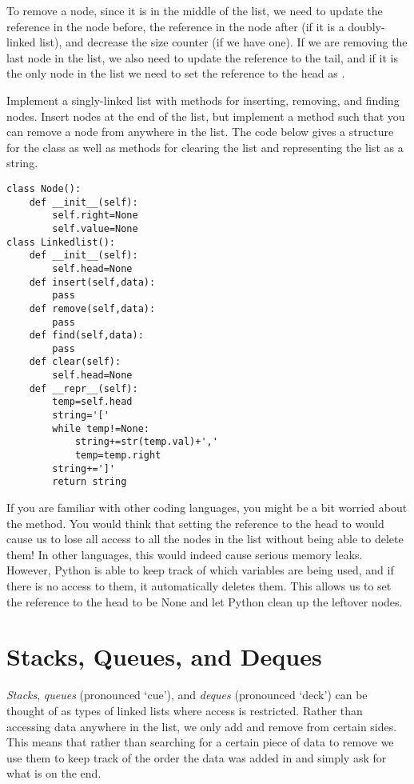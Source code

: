 To remove a node, since it is in the middle of the list, we need to update the reference in the node before, the reference in the node after (if it is a doubly-linked list), and decrease the size counter (if we have one).
If we are removing the last node in the list, we also need to update the reference to the tail, and if it is the only node in the list we need to set the reference to the head as .


\begin{problem}
Implement a singly-linked list with methods for inserting, removing, and finding nodes. Insert nodes at the end of the list, but implement a method such that you can remove a node from anywhere in the list. The code below gives a structure for the class as well as methods for clearing the list and representing the list as a string.
\begin{lstlisting}
class Node():
    def __init__(self):
        self.right=None
        self.value=None
class Linkedlist():
    def __init__(self):
        self.head=None
    def insert(self,data):
        pass
    def remove(self,data):
        pass
    def find(self,data):
        pass
    def clear(self):
        self.head=None
    def __repr__(self):
        temp=self.head
        string='['
        while temp!=None:
            string+=str(temp.val)+','
            temp=temp.right
        string+=']'
        return string
\end{lstlisting}
\label{prob:LinkedLists}
\end{problem}

If you are familiar with other coding languages, you might be a bit worried about the  method.
You would think that setting the reference to the head to  would cause us to lose all access to all the nodes in the list without being able to delete them!
In other languages, this would indeed cause serious memory leaks.
However, Python is able to keep track of which variables are being used, and if there is no access to them, it automatically deletes them.
This allows us to set the reference to the head to be None and let Python clean up the leftover nodes.

\section*{Stacks, Queues, and Deques}
\emph{Stacks}, \emph{queues} (pronounced `cue'), and \emph{deques} (pronounced `deck') can be thought of as types of linked lists where access is restricted. Rather than accessing data anywhere in the list, we only add and remove from certain sides.
This means that rather than searching for a certain piece of data to remove we use them to keep track of the order the data was added in and simply ask for what is on the end.

